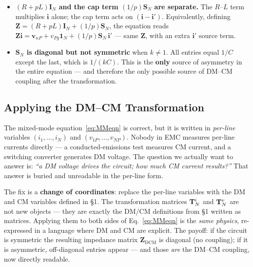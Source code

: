 \begin{statebox}
\begin{itemize}
    \item \textbf{$(R+pL)\mathbf{I}_N$ and the cap term $(1/p)\mathbf{S}_N$ are separate.}
          The $R$--$L$ term multiplies $\mathbf{i}$ alone; the cap term acts on
          $(\mathbf{i} - \mathbf{i}')$.  Equivalently, defining
          $\mathbf{Z} = (R+pL)\mathbf{I}_N + (1/p)\mathbf{S}_N$, the equation reads
          $\mathbf{Z}\mathbf{i} = \mathbf{v}_{nP} + v_{Pg}\mathbf{1}_N
          + (1/p)\mathbf{S}_N\,\mathbf{i}'$ — same $\mathbf{Z}$, with an extra
          $\mathbf{i}'$ source term.
    \item \textbf{$\mathbf{S}_N$ is diagonal but not symmetric}
          when $k \neq 1$.  All entries equal $1/C$ except the
          last, which is $1/(kC)$.  This is the \textbf{only}
          source of asymmetry in the entire equation — and
          therefore the only possible source of DM--CM coupling
          after the transformation.
\end{itemize}
\end{statebox}

\subsection{Applying the DM--CM Transformation}

\begin{physbox}
The mixed-mode equation~\eqref{eq:MMeqn} is correct, but it is written
in \emph{per-line} variables $(i_1, \ldots, i_N)$ and
$(v_{1P}, \ldots, v_{NP})$.  Nobody in EMC measures per-line currents
directly — a conducted-emissions test measures CM current, and a
switching converter generates DM voltage.  The question we actually
want to answer is: \emph{``a DM voltage drives the circuit; how much
CM current results?''}  That answer is buried and unreadable in the
per-line form.

The fix is a \textbf{change of coordinates}: replace the per-line
variables with the DM and CM variables defined in \S1.  The
transformation matrices $\mathbf{T}^{i}_{N}$ and $\mathbf{T}^{v}_{N}$ are not new objects — they
are exactly the DM/CM definitions from \S1 written as matrices.
Applying them to both sides of Eq.~\eqref{eq:MMeqn} is the
\emph{same physics}, re-expressed in a language where DM and CM are
explicit.  The payoff: if the circuit is symmetric the resulting
impedance matrix $\mathbf{Z}_\mathrm{DCM}$ is diagonal (no coupling);
if it is asymmetric, off-diagonal entries appear — and those
\emph{are} the DM--CM coupling, now directly readable.
\end{physbox}

